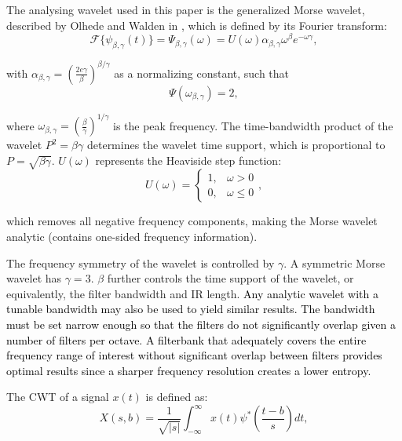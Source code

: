 The analysing wavelet used in this paper is the generalized Morse wavelet, described by Olhede and Walden in \citep{morsewavelets, morsewavelets2}, which is defined by its Fourier transform:
\begin{equation*}
	\mathcal{F}\{\psi_{\beta, \gamma} (t) \} = \Psi_{\beta, \gamma}(\omega) = U(\omega) \alpha_{\beta, \gamma} \omega ^ \beta e^{-\omega \gamma},
\end{equation*}

\noindent with $\alpha_{\beta, \gamma} = (\frac{2e \gamma}{\beta})^{\beta/\gamma}$ as a normalizing constant, such that 
\begin{equation}
	\label{eqn:cwt:bpmag}
\Psi(\omega_{\beta,\gamma}) = 2,
\end{equation}

\noindent where $\omega_{\beta,\gamma} = (\frac{\beta}{\gamma})^{1/\gamma}$ is the peak frequency. The time-bandwidth product of the wavelet $P^2 = \beta \gamma$ determines the wavelet time support, which is proportional to $P = \sqrt{\beta\gamma}$. $U(\omega)$ represents the Heaviside step function:
\begin{equation*}
	U(\omega) = \begin{cases}
		1, & \omega > 0 \\
		0, & \omega \le 0
	\end{cases},
\end{equation*}

\noindent which removes all negative frequency components, making the Morse wavelet analytic (contains one-sided frequency information).

The frequency symmetry of the wavelet is controlled by $\gamma$. A symmetric Morse wavelet has $\gamma = 3$. $\beta$ further controls the time support of the wavelet, or equivalently, the filter bandwidth and IR length. \textcolor{black}{Any analytic wavelet with a tunable bandwidth may also be used to yield similar results. The bandwidth must be set narrow enough so that the filters do not significantly overlap given a number of filters per octave. A filterbank that adequately covers the entire frequency range of interest without significant overlap between filters provides optimal results since a sharper frequency resolution creates a lower entropy.}

The CWT of a signal $x(t)$ is defined as:
\begin{equation}
	\label{eqn:cwt}
	X(s,b) = \frac{1}{\sqrt{|s|}} \int_{-\infty}^{\infty} x(t) \psi^*\left(\frac{t-b}{s}\right) dt,
\end{equation}


